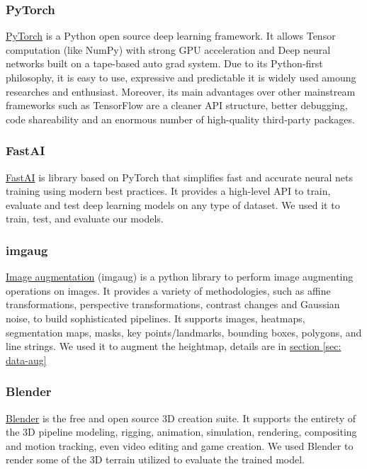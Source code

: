 \documentclass[../document.tex]{subfiles}
\begin{document}
\subsubsection{PyTorch}
\href{https://pytorch.org/}{PyTorch} is a Python open source deep learning framework. It allows Tensor computation (like NumPy) with strong GPU acceleration and Deep neural networks built on a tape-based auto grad system. Due to its Python-first philosophy, it is easy to use, expressive and predictable it is widely used amoung researches and enthusiast. Moreover, its main advantages over other mainstream frameworks such as TensorFlow \cite{tensorflow} are a cleaner API structure, better debugging, code shareability and an enormous number of high-quality third-party packages.

\subsubsection{FastAI}
\href{https://course.fast.ai/}{FastAI} is library based on PyTorch that simplifies fast and accurate neural nets training using modern best practices. It provides a high-level API to train, evaluate and test deep learning models on any type of dataset. We used it to train, test, and evaluate our models.

\subsubsection{imgaug}
\href{https://imgaug.readthedocs.io/en/latest/}{Image augmentation} (imgaug) is a python library to perform image augmenting operations on images. It provides a variety of methodologies, such as affine transformations, perspective transformations, contrast changes and Gaussian noise, to build sophisticated pipelines. It supports images,  heatmaps, segmentation maps, masks, key points/landmarks, bounding boxes, polygons, and line strings. We used it to augment the heightmap, details are in \hyperref[sec: data-aug]{section \ref*{sec: data-aug}}

\subsubsection{Blender}
\href{https://www.blender.org/}{Blender} is the free and open source 3D creation suite. It supports the entirety of the 3D pipeline modeling, rigging, animation, simulation, rendering, compositing and motion tracking, even video editing and game creation. We used Blender to render some of the 3D terrain utilized to evaluate the trained model.
\end{document}
